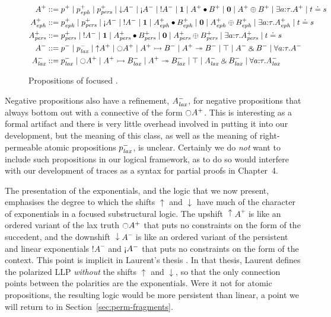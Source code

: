 \begin{figure}
\begin{align*}
A^+ & ::= p^+ \mid p^+_\meph \mid p^+_\mpers
        \mid {\downarrow}A^- \mid {\gnab}A^- \mid {!}A^- 
        \mid \one \mid A^+ \fuse B^+ \mid \zero \mid A^+ \oplus B^+ 
        \mid \exists a{:}\tau. A^+ \mid t \doteq s
\\
A^+_\meph & ::= p^+_\meph \mid p^+_\mpers
        \mid {\gnab}A^- \mid {!}A^- 
        \mid \one \mid A^+_\meph \fuse B^+_\meph
        \mid \zero \mid A^+_\meph \oplus B^+_\meph
        \mid \exists a{:}\tau. A^+_\meph \mid t \doteq s
\\
A^+_\mpers & ::= p^+_\mpers 
        \mid {!}A^- 
        \mid \one \mid A^+_\mpers \fuse B^+_\mpers 
        \mid \zero \mid A^+_\mpers \oplus B^+_\mpers
        \mid \exists a{:}\tau. A^+_\mpers \mid t \doteq s
\\
A^- & ::= p^- \mid p^-_\mlax 
        \mid {\uparrow}A^+ \mid {\ocircle}A^+
        \mid A^+ \lefti B^- \mid A^+ \righti B^-
        \mid \top \mid A^- \with B^-
        \mid \forall a{:}\tau.A^-
\\
A^-_\mlax & ::= p^-_\mlax 
        \mid {\ocircle}A^+
        \mid A^+ \lefti B^-_\mlax \mid A^+ \righti B^-_\mlax
        \mid \top \mid A^-_\mlax \with B^-_\mlax
        \mid \forall a{:}\tau.A^-_\mlax
\end{align*}
\caption{Propositions of focused \ollll.}
\label{fig:ordered}
\end{figure}

Negative propositions also have a refinement, $A^-_{\it lax}$, for
negative propositions that always bottom out with a connective of the
form ${\ocircle}A^+$.  This is interesting as a formal artifact and
there is very little overhead involved in putting it into our
development, but the meaning of this class, as well as the meaning of
right-permeable atomic propositions $p^-_{\it lax}$, is unclear.
Certainly we do {\it not} want to include such propositions in our
logical framework, as to do so would interfere with our development 
of traces as a syntax for partial proofs in Chapter~4.

The presentation of the exponentials, and the logic that we now
present, emphasises the degree to which the shifts ${\uparrow}$ and
${\downarrow}$ have much of the character of exponentials in a focused
substructural logic. The upshift ${\uparrow}A^+$ is like an ordered
variant of the lax truth ${\ocircle}A^+$ that puts no constraints on
the form of the succedent, and the downshift ${\downarrow}A^-$ is
like an ordered variant of the persistent and linear exponentials
${!}A^-$ and ${\gnab}A^-$ that puts no constraints on the form of the
context. This point is implicit in Laurent's thesis
\cite{laurent02etude}. In that thesis, Laurent defines the polarized
LLP {\it without} the shifts ${\uparrow}$ and ${\downarrow}$, so that
the only connection points between the polarities are the
exponentials. Were it not for atomic propositions, the resulting logic
would be more persistent than linear,
a point we will return to in Section~\ref{sec:perm-fragments}.

